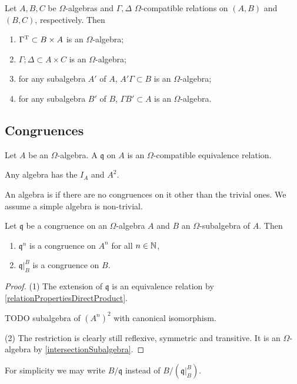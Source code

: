 \begin{lemma}
Let $A,B,C$ be $\Omega$-algebras and $\Gamma, \Delta$ $\Omega$-compatible relations on $(A, B)$ and $(B, C)$, respectively. Then
\begin{enumerate}
\item $\Gamma^{\mathrm{T}} \subset B\times A$ is an $\Omega$-algebra;
\item $\Gamma;\Delta \subset A\times C$ is an $\Omega$-algebra;
\item for any subalgebra $A'$ of $A$, $A'\Gamma \subset B$ is an $\Omega$-algebra;
\item for any subalgebra $B'$ of $B$, $\Gamma B' \subset A$ is an $\Omega$-algebra.
\end{enumerate}
\end{lemma}

\subsection{Congruences}
\begin{definition}
Let $A$ be an $\Omega$-algebra. A  $\mathfrak{q}$ on $A$ is an $\Omega$-compatible equivalence relation.
\end{definition}

\begin{example}
Any algebra has the  $I_A$ and $A^2$.
\end{example}

An algebra is  if there are no congruences on it other than the trivial ones. We assume a simple algebra is non-trivial.

\begin{lemma} \label{basicCongruenceLemma}
Let $\mathfrak{q}$ be a congruence on an $\Omega$-algebra $A$ and $B$ an $\Omega$-subalgebra of $A$. Then
\begin{enumerate}
\item $\mathfrak{q}^n$ is a congruence on $A^n$ for all $n\in \mathbb{N}$,
\item $\mathfrak{q}|_B^B$ is a congruence on $B$.
\end{enumerate}
\end{lemma}
\begin{proof}
(1) The extension of $\mathfrak{q}$ is an equivalence relation by \ref{relationPropertiesDirectProduct}.

TODO subalgebra of $(A^n)^2$ with canonical isomorphism.

(2) The restriction is clearly still reflexive, symmetric and transitive. It is an $\Omega$-algebra by \ref{intersectionSubalgebra}.
\end{proof}
For simplicity we may write $B/\mathfrak{q}$ instead of $B/(\mathfrak{q}|_B^B)$.

